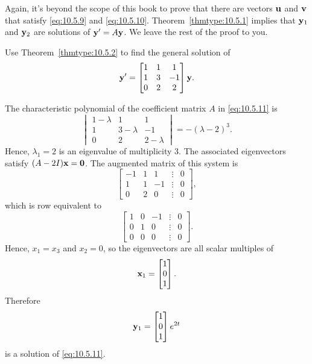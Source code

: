 \documentclass{ximera}
\begin{document}
Again, it's beyond the scope of this book to prove that there are
vectors ${\bf u}$ and ${\bf v}$ that satisfy \eqref{eq:10.5.9} and
\eqref{eq:10.5.10}. Theorem~\ref{thmtype:10.5.1} implies that ${\bf y}_1$ and
${\bf y}_2$ are solutions of ${\bf y}'=A{\bf y}$. We leave the rest of
the proof to you.%

\begin{example}\label{example:10.5.4}
Use Theorem~\ref{thmtype:10.5.2} to find the general solution of
\begin{equation}\label{eq:10.5.11}
{\bf y}'=\begin{bmatrix}1&1&1\\1&3&-1\\0&2&2\end{bmatrix}{\bf y}.
\end{equation}

\begin{explanation}  The characteristic polynomial of
the coefficient matrix $A$ in  \eqref{eq:10.5.11} is
$$
\begin{vmatrix} 1-\lambda & 1 & 1\\ 1 & 3-\lambda
&
-1\\ 0 & 2 & 2-\lambda\end{vmatrix}=-(\lambda-2)^3.
$$
Hence, $\lambda_1=2$ is an eigenvalue of multiplicity $3$. The
associated eigenvectors satisfy $(A-2I){\bf x=0}$. The augmented
matrix of this system is
$$
\begin{bmatrix} -1 & 1 & 1 &\vdots & 0\\
1& 1 & -1 &\vdots & 0\\ 0 & 2 & 0 &
\vdots & 0\end{bmatrix},
$$
which is row equivalent to
$$
\begin{bmatrix} 1 & 0 &- 1 &\vdots& 0\\ 0 & 1 & 0  &\vdots& 0
\\ 0 & 0 & 0 &\vdots&0\end{bmatrix}.
$$
Hence, $x_1 =x_3$ and  $x_2 = 0$, so the eigenvectors are all scalar
multiples of
$$
{\bf x}_1=\begin{bmatrix}1\\0\\1\end{bmatrix}.
$$
Therefore
$$
{\bf y}_1=\begin{bmatrix}1\\0\\1\end{bmatrix}e^{2t}
$$
is a solution of  \eqref{eq:10.5.11}.


\end{explanation}
\end{example}
\end{document}
